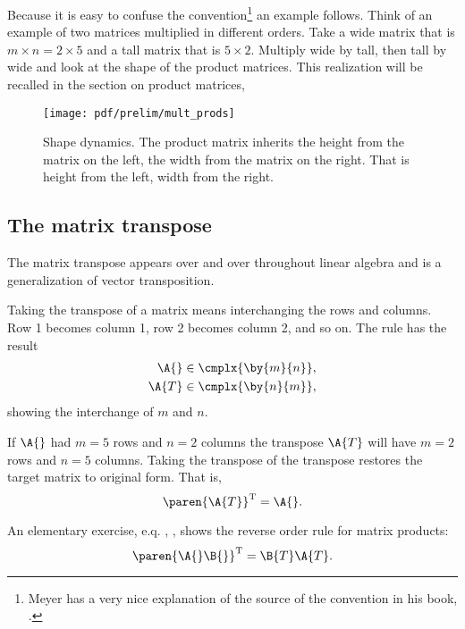 Because it is easy to confuse the convention\footnote{Meyer has a very nice explanation of the source of the convention in his book, \cite[p. 123]{Meyer}.} an example follows. Think of an example of two matrices multiplied in different orders. Take a wide matrix that is $m \times n = 2\times5$ and a tall matrix that is $5\times 2$. Multiply wide by tall, then tall by wide and look at the shape of the product matrices. This realization will be recalled in the section on product matrices,
\begin{figure}[htbp] %
\texttt{[image: pdf/prelim/mult\_prods]}\\
   \caption[Shape dynamics]{Shape dynamics. The product matrix inherits the height from the matrix on the left, the width from the matrix on the right. That is height from the left, width from the right.}
   \label{fig:example}
\end{figure}
\subsection{The matrix transpose}
The matrix transpose appears over and over throughout linear algebra and is a generalization of vector transposition.

Taking the transpose of a matrix means interchanging the rows and columns. Row 1 becomes column 1, row 2 becomes column 2, and so on. The rule has the result
\begin{equation}
  \begin{split}
    \A{}&\in\cmplx{\by{m}{n}},\\
    \A{T}&\in\cmplx{\by{n}{m}},
  \end{split}
\end{equation}
showing the interchange of $m$ and $n$.

If $\A{}$ had $m=5$ rows and $n=2$ columns the transpose $\A{T}$ will have $m=2$ rows and $n=5$ columns. 
Taking the transpose of the transpose restores the target matrix to original form. That is,
\begin{equation}
  \paren{\A{T}}^{\mathrm{T}}=\A{}.
\end{equation}

An elementary exercise, e.q. \cite[p. 10]{Meyer}, \cite[p. 8]{Strang}, shows the reverse order rule for matrix products:
\begin{equation}
  \paren{\A{}\B{}}^{\mathrm{T}}=\B{T}\A{T}.
  \label{eq:mattran}
\end{equation}

